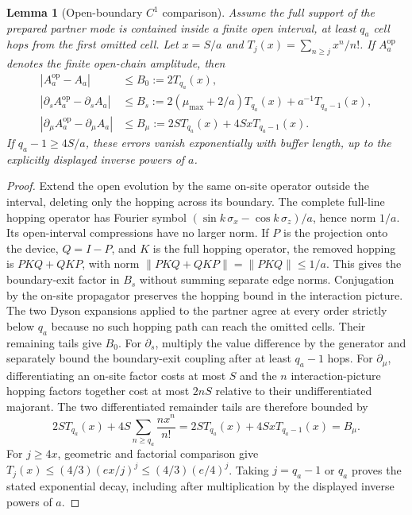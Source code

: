 \documentclass[11pt]{article}
\newtheorem{lemma}[theorem]{Lemma}
\theoremstyle{definition}
\begin{document}
\begin{lemma}[Open-boundary $C^1$ comparison]
\label{lem:boundary-c1}
Assume the full support of the prepared partner mode is contained inside
a finite open interval, at least $q_a$ cell hops from the first omitted
cell. Let $x=S/a$ and $T_j(x)=\sum_{n\ge j}x^n/n!$. If
$A_a^{\mathrm{op}}$ denotes the finite open-chain amplitude, then
\begin{align*}
 |A_a^{\mathrm{op}}-A_a|&\le B_0:=2T_{q_a}(x),\\
 |\partial_sA_a^{\mathrm{op}}-\partial_sA_a|
 &\le B_s:=2(\mu_{\max}+2/a)T_{q_a}(x)+a^{-1}T_{q_a-1}(x),\\
 |\partial_\mu A_a^{\mathrm{op}}-\partial_\mu A_a|
 &\le B_\mu:=2S T_{q_a}(x)+4SxT_{q_a-1}(x).
\end{align*}
If $q_a-1\ge4S/a$, these errors vanish exponentially with buffer
length, up to the explicitly displayed inverse powers of $a$.
\end{lemma}
\begin{proof}
Extend the open evolution by the same on-site operator outside the
interval, deleting only the hopping across its boundary. The complete full-line hopping operator has Fourier symbol
$(\sin k\,\sigma_x-\cos k\,\sigma_z)/a$, hence norm $1/a$.
Its open-interval compressions have no larger norm. If $P$ is the
projection onto the device, $Q=I-P$, and $K$ is the full hopping
operator, the removed hopping is $PKQ+QKP$, with norm
$\|PKQ+QKP\|=\|PKQ\|\le1/a$. This gives the boundary-exit
factor in $B_s$ without summing separate edge norms. Conjugation by
the on-site propagator preserves the hopping bound in the interaction picture.
The two Dyson expansions applied to the partner agree at every order
strictly below $q_a$ because no such hopping path can reach the omitted
cells. Their remaining tails give $B_0$. For $\partial_s$, multiply the
value difference by the generator and separately bound the boundary-exit
coupling after at least $q_a-1$ hops. For $\partial_\mu$, differentiating
an on-site factor costs at most $S$ and the $n$ interaction-picture
hopping factors together cost at most $2nS$ relative to their
undifferentiated majorant. The two differentiated remainder tails are
therefore bounded by
\[
 2S T_{q_a}(x)+4S\sum_{n\ge q_a}\frac{n x^n}{n!}
 =2S T_{q_a}(x)+4SxT_{q_a-1}(x)=B_\mu.
\]
For $j\ge4x$, geometric and factorial comparison give
$T_j(x)\le(4/3)(ex/j)^j\le(4/3)(e/4)^j$.
Taking $j=q_a-1$ or $q_a$ proves the stated exponential decay,
including after multiplication by the displayed inverse powers of $a$.
\end{proof}
\end{document}
